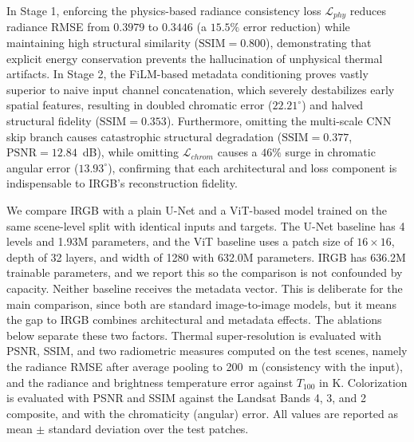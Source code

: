 In Stage 1, enforcing the physics-based radiance consistency loss $\mathcal{L}_{phy}$ reduces radiance RMSE from $0.3979$ to $0.3446$ (a $15.5\%$ error reduction) while maintaining high structural similarity ($\text{SSIM} = 0.800$), demonstrating that explicit energy conservation prevents the hallucination of unphysical thermal artifacts. In Stage 2, the FiLM-based metadata conditioning proves vastly superior to naive input channel concatenation, which severely destabilizes early spatial features, resulting in doubled chromatic error ($22.21^\circ$) and halved structural fidelity ($\text{SSIM} = 0.353$). Furthermore, omitting the multi-scale CNN skip branch causes catastrophic structural degradation ($\text{SSIM} = 0.377$, $\text{PSNR} = 12.84$~dB), while omitting $\mathcal{L}_{chrom}$ causes a $46\%$ surge in chromatic angular error ($13.93^\circ$), confirming that each architectural and loss component is indispensable to IRGB's reconstruction fidelity.

We compare IRGB with a plain U-Net and a ViT-based model trained on the same scene-level split with identical inputs and targets. The U-Net baseline has 4 levels and 1.93M parameters, and the ViT baseline uses a patch size of $16 \times 16$, depth of 32 layers, and width of 1280 with 632.0M parameters. IRGB has 636.2M trainable parameters, and we report this so the comparison is not confounded by capacity. Neither baseline receives the metadata vector. This is deliberate for the main comparison, since both are standard image-to-image models, but it means the gap to IRGB combines architectural and metadata effects. The ablations below separate these two factors. Thermal super-resolution is evaluated with PSNR, SSIM, and two radiometric measures computed on the test scenes, namely the radiance RMSE after average pooling to 200~m (consistency with the input), and the radiance and brightness temperature error against $T_{100}$ in K. Colorization is evaluated with PSNR and SSIM against the Landsat Bands 4, 3, and 2 composite, and with the chromaticity (angular) error. All values are reported as mean $\pm$ standard deviation over the test patches.

